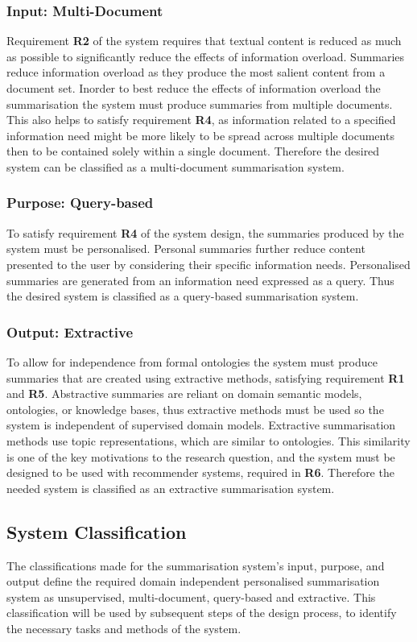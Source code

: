 \subsubsection{Input: Multi-Document}
Requirement \textbf{R2} of the system requires that textual content is reduced as much as possible to significantly reduce the effects of information overload. Summaries reduce information overload as they produce the most salient content from a document set. Inorder to best reduce the effects of information overload the summarisation the system must produce summaries from multiple documents. This also helps to satisfy requirement \textbf{R4}, as information related to a specified information need might be more likely to be spread across multiple documents then to be contained solely within a single document. Therefore the desired system can be classified as a multi-document summarisation system.

\subsubsection{Purpose: Query-based}
To satisfy requirement \textbf{R4} of the system design, the summaries produced by the system must be personalised. Personal summaries further reduce content presented to the user by considering their specific information needs. Personalised summaries are generated from an information need expressed as a query. Thus the desired system is classified as a query-based summarisation system. 

\subsubsection{Output: Extractive}
To allow for independence from formal ontologies the system must produce summaries that are created using extractive methods, satisfying requirement \textbf{R1} and \textbf{R5}. Abstractive summaries are reliant on domain semantic models, ontologies, or knowledge bases, thus extractive methods must be used so the system is independent of  supervised domain models. Extractive summarisation methods use topic representations, which are similar to ontologies. This similarity is one of the key motivations to the research question, and the system must be designed to be used with recommender systems, required in \textbf{R6}. Therefore the needed system is classified as an extractive summarisation system.

\subsection*{System Classification}
The classifications made for the summarisation system’s input, purpose, and output define the required domain independent personalised summarisation system as unsupervised, multi-document, query-based and extractive. This classification will be used by subsequent steps of the design process, to identify the necessary tasks and methods of the system.

